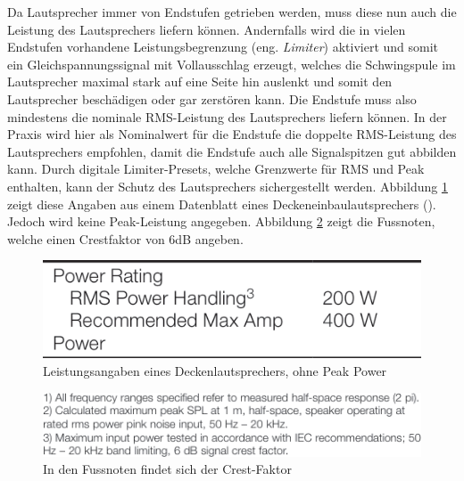 Da Lautsprecher immer von Endstufen getrieben werden, muss diese nun auch die Leistung des Lautsprechers liefern können. Andernfalls wird die in vielen Endstufen vorhandene Leistungsbegrenzung (eng. \textit{Limiter}) aktiviert und somit ein Gleichspannungssignal mit Vollausschlag erzeugt, welches die Schwingspule im Lautsprecher maximal stark auf eine Seite hin auslenkt und somit den Lautsprecher beschädigen oder gar zerstören kann. Die Endstufe muss also mindestens die nominale RMS-Leistung des Lautsprechers liefern können. In der Praxis wird hier als Nominalwert für die Endstufe die doppelte RMS-Leistung des Lautsprechers empfohlen, damit die Endstufe auch alle Signalspitzen gut abbilden kann. Durch digitale Limiter-Presets, welche Grenzwerte für RMS und Peak enthalten, kann der Schutz des Lautsprechers sichergestellt werden. 
Abbildung \ref{pics:adc820_pwr} zeigt diese Angaben aus einem Datenblatt eines Deckeneinbaulautsprechers (\cite{adc820man}). Jedoch wird keine Peak-Leistung angegeben. Abbildung \ref{pics:adc820_footnote} zeigt die Fussnoten, welche einen Crestfaktor von 6dB angeben.
\begin{figure}[H]
	\centering
	\includegraphics[width=\textwidth*5/9]{pictures/adc820_pwr.png}
	\caption{Leistungsangaben eines Deckenlautsprechers, ohne Peak Power}
	\label{pics:adc820_pwr}
\end{figure}
\begin{figure}[H]
	\centering
	\includegraphics[width=\textwidth*5/9]{pictures/adc820_footnotes.png}
	\caption{In den Fussnoten findet sich der Crest-Faktor}
	\label{pics:adc820_footnote}
\end{figure}
